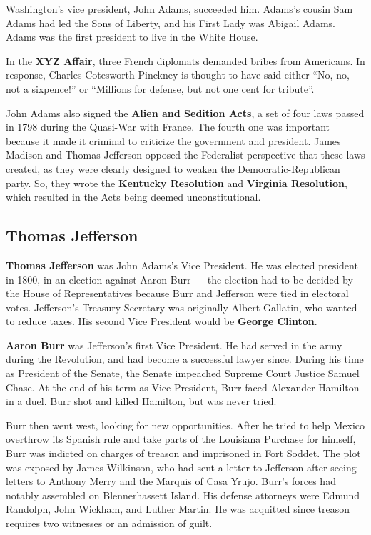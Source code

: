 Washington's vice president, John Adams, succeeded him.
Adams's cousin Sam Adams had led the Sons of Liberty,
and his First Lady was Abigail Adams.
Adams was the first president to live in the White House.

In the \textbf{XYZ Affair}, three French diplomats demanded bribes from Americans.
In response, Charles Cotesworth Pinckney is thought to have said either
``No, no, not a sixpence!'' or ``Millions for defense, but not one cent for tribute''.

John Adams also signed the \textbf{Alien and Sedition Acts},
a set of four laws passed in 1798 during the Quasi-War with France.
The fourth one was important because it made it criminal to criticize the government and president.
James Madison and Thomas Jefferson opposed the Federalist perspective that these laws created,
as they were clearly designed to weaken the Democratic-Republican party.
So, they wrote the \textbf{Kentucky Resolution} and \textbf{Virginia Resolution},
which resulted in the Acts being deemed unconstitutional.

\subsection*{Thomas Jefferson}

\textbf{Thomas Jefferson} was John Adams's Vice President.
He was elected president in 1800, in an election against Aaron Burr ---
the election had to be decided by the House of Representatives
because Burr and Jefferson were tied in electoral votes.
Jefferson's Treasury Secretary was originally Albert Gallatin, who wanted to reduce taxes.
His second Vice President would be \textbf{George Clinton}.

\textbf{Aaron Burr} was Jefferson's first Vice President.
He had served in the army during the Revolution, and had become a successful lawyer since.
During his time as President of the Senate, the Senate impeached Supreme Court Justice Samuel Chase.
At the end of his term as Vice President, Burr faced Alexander Hamilton in a duel.
Burr shot and killed Hamilton, but was never tried.

Burr then went west, looking for new opportunities.
After he tried to help Mexico overthrow its Spanish rule and take parts of the Louisiana Purchase for himself,
Burr was indicted on charges of treason and imprisoned in Fort Soddet.
The plot was exposed by James Wilkinson, who had sent a letter to Jefferson
after seeing letters to Anthony Merry and the Marquis of Casa Yrujo.
Burr's forces had notably assembled on Blennerhassett Island.
His defense attorneys were Edmund Randolph, John Wickham, and Luther Martin.
He was acquitted since treason requires two witnesses or an admission of guilt.

